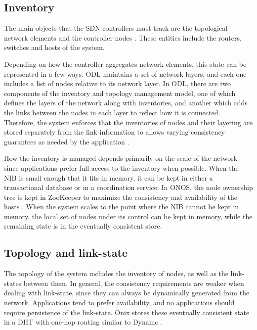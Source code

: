 \documentclass[letterpaper,twocolumn,10pt]{article}
\begin{document}
\subsection*{Inventory}

The main objects that the SDN controllers must track are the topological network elements and the controller nodes \cite{network2015topologies}. These entities include the routers, switches and hosts of the system.

Depending on how the controller aggregates network elements, this state can be represented in a few ways. ODL maintains a set of network layers, and each one includes a list of nodes relative to its network layer. In ODL, there are two components of the inventory and topology management model, one of which defines the layers of the network along with inventories, and another which adds the links between the nodes in each layer to reflect how it is connected.
Therefore, the system enforces that the inventories of nodes and their layering are stored separately from the link information to allows varying consistency guarantees as needed by the application \cite{ODL}.

How the inventory is managed depends primarily on the scale of the network since applications prefer full access to the inventory when possible. When the NIB is small enough that it fits in memory, it can be kept in either a transactional database or in a coordination service. In ONOS, the node ownership tree is kept in ZooKeeper to maximize the consistency and availability of the hosts \cite{berde2014onos}. When the system scales to the point where the NIB cannot be kept in memory, the local set of nodes under its control can be kept in memory, while the remaining state is in the eventually consistent store.

\subsection*{Topology and link-state}

The topology of the system includes the inventory of nodes, as well as the link-states between them. In general, the consistency requirements are weaker when dealing with link-state, since they can always be dynamically generated from the network. Applications tend to prefer availability, and no applications should require persistence of the link-state. Onix stores these eventually consistent state in a DHT with one-hop routing similar to Dynamo \cite{decandia2007dynamo}.
\end{document}
